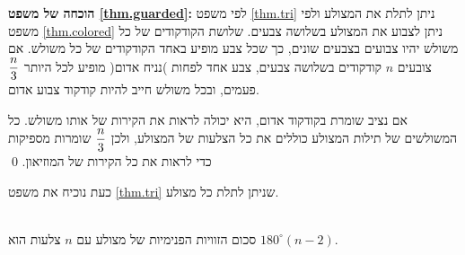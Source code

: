 \textbf{הוכחה של משפט
\ref{thm.guarded}:}
לפי משפט
\ref{thm.tri}
ניתן לתלת את המצולע ולפי משפט
\ref{thm.colored}
ניתן לצבוע את המצולע בשלושה צבעים. שלושת הקודקודים של כל משולש יהיו צבועים בצבעים שונים, כך שכל צבע מופיע באחד הקודקודים של כל משולש. אם צובעים 
$n$
קודקודים בשלושה צבעים, צבע אחד לפחות )נניח אדום( מופיע לכל היותר
$\displaystyle\frac{n}{3}$
פעמים, ובכל משולש חייב להיות קודקוד צבוע אדום.

אם נציב שומרת בקודקוד אדום, היא יכולה לראות את הקירות של אותו משולש. כל המשולשים של תילות המצולע כוללים את כל הצלעות של המצולע, ולכן
$\displaystyle\frac{n}{3}$
שומרות מספיקות כדי לראות את כל הקירות של המוזיאון.
\qed

כעת נוכיח את משפט
\ref{thm.tri}
שניתן לתלת כל מצולע.

\begin{theorem}\mbox{}\\
סכום הזוויות הפנימיות של מצולע עם
$n$
צלעות הוא
$180^\circ(n-2)$.
\end{theorem}

\newpage

